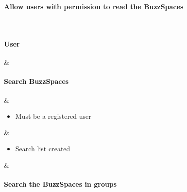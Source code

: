 \begin{table}
\begin{tabularx}{\textwidth}
			\paragraph{Allow users with permission to read the BuzzSpaces}
			\\
			\hline
			
			\paragraph{User}
			&
			\paragraph{Search BuzzSpaces}
			&
			\begin{itemize}
				\item Must be a registered user
			\end{itemize} &
			\begin{itemize}
				\item Search list created
			\end{itemize} &
			\paragraph{Search the BuzzSpaces in groups}
			\\
			\hline
			
			
		\end{tabularx}
	\end{table}


